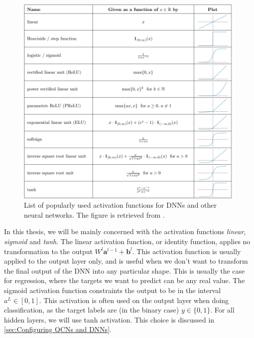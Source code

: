 \begin{figure}[H]
    \centering
    \includegraphics[width=12cm]{latex/figures/activations.png}
    \caption{List of popularly used activation functions for DNNs and other neural networks. The figure is retrieved from \citet{DBLP:journals/corr/abs-2105-04026}.}
    \label{fig:activation function}
\end{figure}

In this thesis, we will be mainly concerned with the activation functions \emph{linear}, \emph{sigmoid} and \emph{tanh}. The linear activation function, or identity function, applies no transformation to the output $W^l \boldsymbol{a}^{l-1} + \boldsymbol{b}^l$. This activation function is usually applied to the output layer only, and is useful when we don't want to transform the final output of the DNN into any particular shape. This is usually the case for regression, where the targets we want to predict can be any real value. The sigmoid activation function constraints the output to be in the interval $a^L \in [0, 1]$. This activation is often used on the output layer when doing classification, as the target labels are (in the binary case) $y \in \{0,1\}$. For all hidden layers, we will use tanh activation. This choice is discussed in \autoref{sec:Configuring QCNs and DNNs}.


